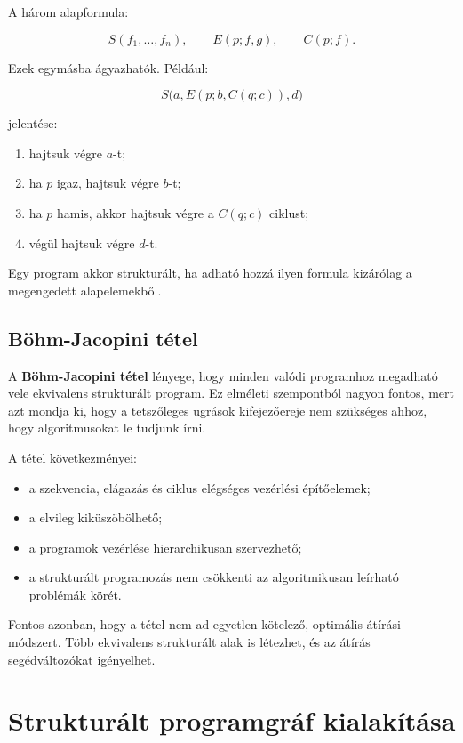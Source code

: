 A három alapformula:

\[
S(f_1,\ldots,f_n),\qquad E(p;f,g),\qquad C(p;f).
\]

Ezek egymásba ágyazhatók. Például:

\[
S\bigl(a, E(p; b, C(q;c)), d\bigr)
\]

jelentése:

\begin{enumerate}
  \item hajtsuk végre $a$-t;
  \item ha $p$ igaz, hajtsuk végre $b$-t;
  \item ha $p$ hamis, akkor hajtsuk végre a $C(q;c)$ ciklust;
  \item végül hajtsuk végre $d$-t.
\end{enumerate}

Egy program akkor strukturált, ha adható hozzá ilyen formula kizárólag a megengedett alapelemekből.

\subsection{Böhm-Jacopini tétel}

A \textbf{Böhm-Jacopini tétel} lényege, hogy minden valódi programhoz megadható vele ekvivalens strukturált program. Ez elméleti szempontból nagyon fontos, mert azt mondja ki, hogy a tetszőleges ugrások kifejezőereje nem szükséges ahhoz, hogy algoritmusokat le tudjunk írni.

A tétel következményei:

\begin{itemize}
  \item a szekvencia, elágazás és ciklus elégséges vezérlési építőelemek;
  \item a  elvileg kiküszöbölhető;
  \item a programok vezérlése hierarchikusan szervezhető;
  \item a strukturált programozás nem csökkenti az algoritmikusan leírható problémák körét.
\end{itemize}

Fontos azonban, hogy a tétel nem ad egyetlen kötelező, optimális átírási módszert. Több ekvivalens strukturált alak is létezhet, és az átírás segédváltozókat igényelhet.

\section{Strukturált programgráf kialakítása}

